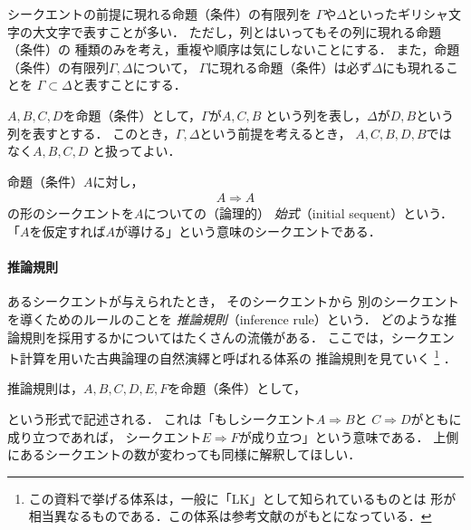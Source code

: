  シークエントの前提に現れる命題（条件）の有限列を
 $\varGamma$や$\varDelta$といったギリシャ文字の大文字で表すことが多い．
 ただし，列とはいってもその列に現れる命題（条件）の
 種類のみを考え，重複や順序は気にしないことにする．
 また，命題（条件）の有限列$\varGamma,  \varDelta$について，
 $\varGamma$に現れる命題（条件）は必ず$\varDelta$にも現れることを
 $\varGamma \subset \varDelta$と表すことにする．

 \begin{ex}
   $A,  B,  C,  D$を命題（条件）として，$\varGamma$が$A,  C,  B$
   という列を表し，$\varDelta$が$D,  B$という列を表すとする．
   このとき，$\varGamma,  \varDelta$という前提を考えるとき，
   $A,  C,  B,  D,  B$ではなく$A,  B,  C,   D$
   と扱ってよい．
 \end{ex}

 命題（条件）$A$に対し，
 \begin{align}
   A \Longrightarrow A 
   \label{eq:sisiki}
 \end{align}
 の形のシークエントを$A$についての（論理的）
 \emph{始式}（initial sequent）という．
 「$A$を仮定すれば$A$が導ける」という意味のシークエントである．

 \paragraph{推論規則}
 あるシークエントが与えられたとき，
 そのシークエントから
 別のシークエントを導くためのルールのことを
 \emph{推論規則}（inference rule）という．
 どのような推論規則を採用するかについてはたくさんの流儀がある．
 ここでは，シークエント計算を用いた古典論理の自然演繹と呼ばれる体系の
 推論規則を見ていく
 \footnote{この資料で挙げる体系は，一般に「LK」として知られているものとは
 形が相当異なるものである．この体系は参考文献の\cite{yosida}がもとになっている．}
 ．
 
 推論規則は，$A,  B,  C,  D,  E,  F$を命題（条件）として，
  \begin{prooftree}
  \end{prooftree}
 という形式で記述される．
 これは「もしシークエント$A \Longrightarrow B$と
 $C \Longrightarrow D$がともに成り立つであれば，
 シークエント$E \Longrightarrow F$が成り立つ」という意味である．
 上側にあるシークエントの数が変わっても同様に解釈してほしい． 

